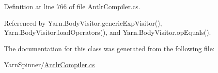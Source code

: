 Definition at line 766 of file Antlr\-Compiler.\-cs.



Referenced by Yarn.\-Body\-Visitor.\-generic\-Exp\-Visitor(), Yarn.\-Body\-Visitor.\-load\-Operators(), and Yarn.\-Body\-Visitor.\-op\-Equals().



The documentation for this class was generated from the following file\-:\begin{DoxyCompactItemize}
\item 
Yarn\-Spinner/\hyperlink{a00306}{Antlr\-Compiler.\-cs}\end{DoxyCompactItemize}
